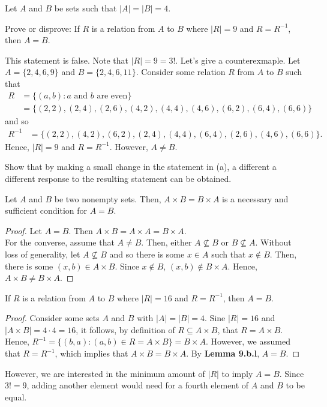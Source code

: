 \documentclass[12pt]{article}
\newenvironment{theorem}[2][Theorem]{\begin{trivlist}
		\item[\hskip \labelsep {\bfseries #1}\hskip \labelsep {\bfseries #2.}]}{\end{trivlist}}
\newenvironment{lemma}[2][Lemma]{\begin{trivlist}
		\item[\hskip \labelsep {\bfseries #1}\hskip \labelsep {\bfseries #2.}]}{\end{trivlist}}
\newenvironment{problem}[2][Problem]{\begin{trivlist}
		\item[\hskip \labelsep {\bfseries #1}\hskip \labelsep {\bfseries #2.}]}{\end{trivlist}}
\newenvironment{solution}[2][Solution]{\begin{trivlist}
		\item[\hskip \labelsep {\bfseries #1}\hskip \labelsep {\bfseries #2.}]}{\end{trivlist}}
\begin{document}
	\begin{problem}{9}
		Let $A$ and $B$ be sets such that $|A|=|B|=4$.
		\begin{enumerate}[label=(\alph*)]
			\item Prove or disprove: If $R$ is a relation from $A$ to $B$ where $|R| = 9$ and $R=R^{-1}$, then $A=B$.
			\begin{solution}{9}
				This statement is false. Note that $|R|=9=3!$. Let's give a counterexmaple. Let $A=\{2,4,6,9\}$ and $B=\{2,4,6,11\}$. Consider some relation $R$ from $A$ to $B$ such that 
				\begin{align*}
				 R &= \{(a,b):a\text{ and }b \text{ are even}\}\\
				 &=\{(2,2),(2,4),(2,6),(4,2),(4,4),(4,6),(6,2),(6,4),(6,6)\}
				\end{align*}
				and so
				\begin{align*}
				R^{-1} &= \{(2,2),(4,2),(6,2),(2,4),(4,4),(6,4),(2,6),(4,6),(6,6)\}.
				\end{align*}
				Hence, $|R|=9$ and $R=R^{-1}$. However, $A\neq B$.
			\end{solution}
			\item Show that by making a small change in the statement in (a), a different a different response to the resulting statement can be obtained.
			\begin{solution}{b}
				\begin{lemma}{9.b.l}
					Let $A$ and $B$ be two nonempty sets. Then, $A\times B = B\times A$ is a necessary and sufficient condition for $A=B$. 
					\begin{proof}
						Let $A=B$. Then $A\times B = A\times A = B\times A$. \\
						For the converse, assume that $A\neq B$. Then, either $A\not\subseteq B$ or $B\not\subseteq A$. Without loss of generality, let $A\not\subseteq B$ and so there is some $x\in A$ such that $x\not\in B$. Then, there is some $(x,b) \in A\times B$. Since $x\not\in B$, $(x,b) \not\in B\times A$. Hence, $A\times B \neq B\times A$.
					\end{proof}
				\end{lemma}
				\begin{theorem}{9.b}
					If $R$ is a relation from $A$ to $B$ where $|R| = 16$ and $R=R^{-1}$, then $A=B$.
					\begin{proof}
						Consider some sets $A$ and $B$ with $|A|=|B|=4$. Sine $|R| = 16$ and $|A\times B| = 4\cdot 4 = 16$, it follows, by definition of $R\subseteq A\times B$, that $R= A\times B$. Hence, $R^{-1}= \{(b,a):(a,b)\in R=A\times B\}=B\times A$. However, we assumed that $R = R^{-1}$, which implies that $A\times B = B\times A$. By \textbf{Lemma 9.b.l}, $A=B$.
					\end{proof}
				\end{theorem}
			
				However, we are interested in the minimum amount of $|R|$ to imply $A=B$. Since $3!=9$, adding another element would need for a fourth element of $A$ and $B$ to be equal.
			\end{solution}
		\end{enumerate}  
	\end{problem}
\end{document}
